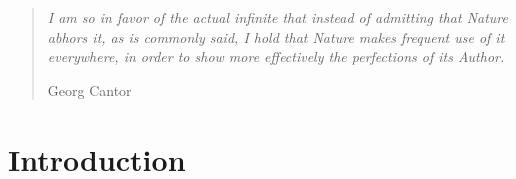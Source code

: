 \newsavebox{\codebox}

\begin{quote}
\textit{I am so in favor of the actual infinite that instead of admitting that Nature abhors it, as is commonly said, I hold that Nature makes frequent use of it everywhere, in order to show more effectively the perfections of its Author.}

\hfill Georg Cantor
\end{quote}

\section{Introduction}

